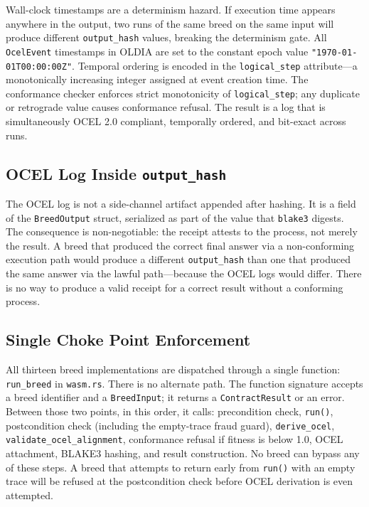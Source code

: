 Wall-clock timestamps are a determinism hazard. If execution time appears anywhere in the output, two runs of the same breed on the same input will produce different \texttt{output\_hash} values, breaking the determinism gate. All \texttt{OcelEvent} timestamps in OLDIA are set to the constant epoch value \texttt{"1970-01-01T00:00:00Z"}. Temporal ordering is encoded in the \texttt{logical\_step} attribute---a monotonically increasing integer assigned at event creation time. The conformance checker enforces strict monotonicity of \texttt{logical\_step}; any duplicate or retrograde value causes conformance refusal. The result is a log that is simultaneously OCEL 2.0 compliant, temporally ordered, and bit-exact across runs.

\subsection{OCEL Log Inside \texttt{output\_hash}}

The OCEL log is not a side-channel artifact appended after hashing. It is a field of the \texttt{BreedOutput} struct, serialized as part of the value that \texttt{blake3} digests. The consequence is non-negotiable: the receipt attests to the process, not merely the result. A breed that produced the correct final answer via a non-conforming execution path would produce a different \texttt{output\_hash} than one that produced the same answer via the lawful path---because the OCEL logs would differ. There is no way to produce a valid receipt for a correct result without a conforming process.

\subsection{Single Choke Point Enforcement}

All thirteen breed implementations are dispatched through a single function: \texttt{run\_breed} in \texttt{wasm.rs}. There is no alternate path. The function signature accepts a breed identifier and a \texttt{BreedInput}; it returns a \texttt{ContractResult} or an error. Between those two points, in this order, it calls: precondition check, \texttt{run()}, postcondition check (including the empty-trace fraud guard), \texttt{derive\_ocel}, \texttt{validate\_ocel\_alignment}, conformance refusal if fitness is below 1.0, OCEL attachment, BLAKE3 hashing, and result construction. No breed can bypass any of these steps. A breed that attempts to return early from \texttt{run()} with an empty trace will be refused at the postcondition check before OCEL derivation is even attempted.

